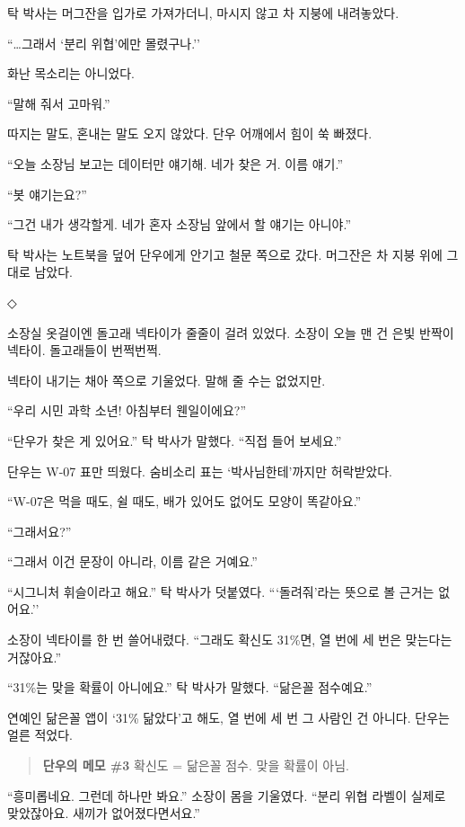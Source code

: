 \documentclass[
  korean,
  letterpaper,
  twoside,
  open=any,
  fontsize=12.5pt,
  headings=small]{scrbook}
\begin{document}
탁 박사는 머그잔을 입가로
가져가더니, 마시지 않고 차
지붕에 내려놓았다.

``\ldots 그래서 `분리
위협'에만 몰렸구나.''

화난 목소리는 아니었다.

``말해 줘서 고마워.''

따지는 말도, 혼내는 말도 오지
않았다. 단우 어깨에서 힘이 쑥
빠졌다.

``오늘 소장님 보고는 데이터만
얘기해. 네가 찾은 거. 이름
얘기.''

``봇 얘기는요?''

``그건 내가 생각할게. 네가
혼자 소장님 앞에서 할 얘기는
아니야.''

탁 박사는 노트북을 덮어
단우에게 안기고 철문 쪽으로
갔다. 머그잔은 차 지붕 위에
그대로 남았다.

\begin{center}◇\end{center}\nopagebreak

소장실 옷걸이엔 돌고래
넥타이가 줄줄이 걸려 있었다.
소장이 오늘 맨 건 은빛 반짝이
넥타이. 돌고래들이 번쩍번쩍.

넥타이 내기는 채아 쪽으로
기울었다. 말해 줄 수는
없었지만.

``우리 시민 과학 소년!
아침부터 웬일이에요?''

``단우가 찾은 게 있어요.'' 탁
박사가 말했다. ``직접 들어
보세요.''

단우는 W-07 표만 띄웠다.
숨비소리 표는
`박사님한테'까지만 허락받았다.

``W-07은 먹을 때도, 쉴 때도,
배가 있어도 없어도 모양이
똑같아요.''

``그래서요?''

``그래서 이건 문장이 아니라,
이름 같은 거예요.''

``시그니처 휘슬이라고 해요.''
탁 박사가 덧붙였다.
```돌려줘'라는 뜻으로 볼
근거는 없어요.''

소장이 넥타이를 한 번
쓸어내렸다. ``그래도 확신도
31\%면, 열 번에 세 번은
맞는다는 거잖아요.''

``31\%는 맞을 확률이
아니에요.'' 탁 박사가 말했다.
``닮은꼴 점수예요.''

연예인 닮은꼴 앱이 `31\%
닮았다'고 해도, 열 번에 세 번
그 사람인 건 아니다. 단우는
얼른 적었다.

\begin{quote}
\textbf{단우의 메모 \#3}
확신도 = 닮은꼴 점수. 맞을
확률이 아님.
\end{quote}

``흥미롭네요. 그런데 하나만
봐요.'' 소장이 몸을 기울였다.
``분리 위협 라벨이 실제로
맞았잖아요. 새끼가
없어졌다면서요.''
\end{document}
